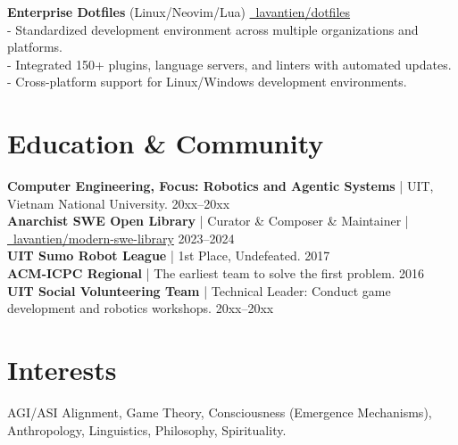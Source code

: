 \documentclass[10pt, a4paper]{article}
\begin{document}
\textbf{Enterprise Dotfiles} (Linux/Neovim/Lua) \hfill \href{https://github.com/lavantien/dotfiles}{\faGithub\ lavantien/dotfiles} \\
- Standardized development environment across multiple organizations and platforms. \\
- Integrated 150+ plugins, language servers, and linters with automated updates. \\
- Cross-platform support for Linux/Windows development environments.

\section*{Education \& Community}
\textbf{Computer Engineering, Focus: Robotics and Agentic Systems} | UIT, Vietnam National University. \hfill 20xx--20xx \\
\textbf{Anarchist SWE Open Library} | Curator \& Composer \& Maintainer | \href{https://github.com/lavantien/modern-swe-library}{\faGithub\ lavantien/modern-swe-library} \hfill 2023--2024 \\
\textbf{UIT Sumo Robot League} | 1st Place, Undefeated. \hfill 2017 \\
\textbf{ACM-ICPC Regional} | The earliest team to solve the first problem. \hfill 2016 \\
\textbf{UIT Social Volunteering Team} | Technical Leader: Conduct game development and robotics workshops. \hfill 20xx--20xx

\section*{Interests}
AGI/ASI Alignment, Game Theory, Consciousness (Emergence Mechanisms), Anthropology, Linguistics, Philosophy, Spirituality.
\end{document}
